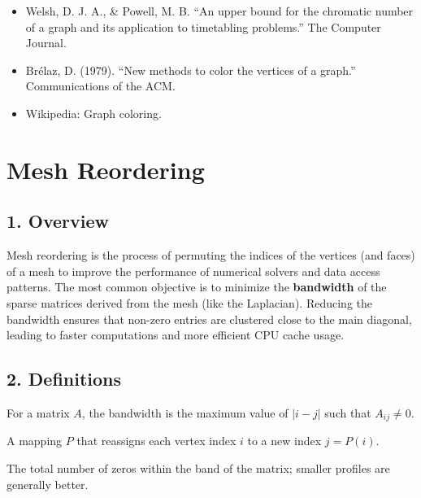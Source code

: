 \begin{itemize}
    \item Welsh, D. J. A., \& Powell, M. B. \cite{welsh1967} ``An upper bound for the chromatic number of a graph and its application to timetabling problems.'' The Computer Journal.
    \item Br\'elaz, D. (1979). ``New methods to color the vertices of a graph.'' Communications of the ACM.
    \item Wikipedia: Graph coloring.
\end{itemize}

\section{Mesh Reordering}
\label{sec:mesh_reordering}

\subsection{1. Overview}

Mesh reordering is the process of permuting the indices of the vertices (and faces) of a mesh to improve the performance of numerical solvers and data access patterns. The most common objective is to minimize the \textbf{bandwidth} of the sparse matrices derived from the mesh (like the Laplacian). Reducing the bandwidth ensures that non-zero entries are clustered close to the main diagonal, leading to faster computations and more efficient CPU cache usage\cite{cuthill1969}.

\subsection{2. Definitions}

\begin{definition}[Bandwidth]\label{def:bandwidth}
For a matrix $A$, the bandwidth is the maximum value of $|i - j|$ such that $A_{ij} \ne 0$.
\end{definition}

\begin{definition}[Permutation]\label{def:permutation}
A mapping $P$ that reassigns each vertex index $i$ to a new index $j = P(i)$.
\end{definition}

\begin{definition}[Profile]\label{def:matrix_profile}
The total number of zeros within the band of the matrix; smaller profiles are generally better.
\end{definition}


